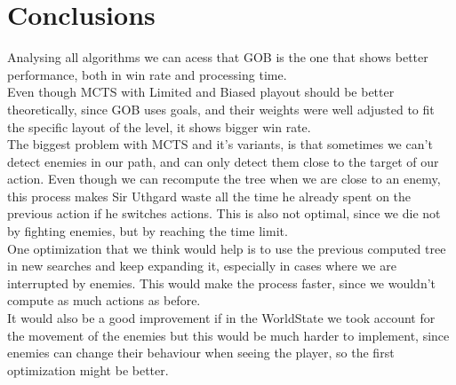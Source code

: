 \documentclass{article}
\begin{document}
  \section{Conclusions}
  Analysing all algorithms we can acess that GOB is the one that shows better performance, both in win rate and processing time.\\
  Even though MCTS with Limited and Biased playout should be better theoretically, since GOB uses goals, and their weights were well adjusted to fit the 
  specific layout of the level, it shows bigger win rate.\\
  The biggest problem with MCTS and it's variants, is that sometimes we can't detect enemies in our path, and can only detect them close to the target of our action.
  Even though we can recompute the tree when we are close to an enemy, this process makes Sir Uthgard waste all the time he already spent on the previous action if he switches
  actions. This is also not optimal, since we die not by fighting enemies, but by reaching the time limit. \\
  One optimization that we think would help is to use the previous computed tree in new searches and keep expanding it, especially in cases where we are interrupted by enemies. 
  This would make the process faster, since we wouldn't compute as much actions as before.\\
  It would also be a good improvement if in the WorldState we took account for the movement of the enemies but this would be much harder to implement, since enemies can
  change their behaviour when seeing the player, so the first optimization might be better.
\end{document}

